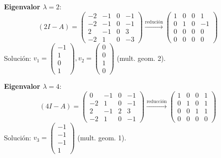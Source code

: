 \begin{prob}
\begin{enumerate}[$a)$]
\begin{myproof}
\textbf{Eigenvalor $\lambda=2$}:
\[
(2I - A) = \begin{pmatrix}
-2 & -1 & 0 & -1 \\
-2 & -1 & 0 & -1 \\
2 & -1 & 0 & 3 \\
-2 & 1 & 0 & -3
\end{pmatrix} \xrightarrow{\text{redución}} \begin{pmatrix}
1 & 0 & 0 & 1 \\
0 & 1 & 0 & -1 \\
0 & 0 & 0 & 0 \\
0 & 0 & 0 & 0
\end{pmatrix}
\]
Solución: $v_1 = \begin{pmatrix} -1 \\ 1 \\ 0 \\ 1 \end{pmatrix}, v_2 = \begin{pmatrix} 0 \\ 0 \\ 1 \\ 0 \end{pmatrix}$ (mult. geom. 2).

\textbf{Eigenvalor $\lambda=4$}:
\[
(4I - A) = \begin{pmatrix}
0 & -1 & 0 & -1 \\
-2 & 1 & 0 & -1 \\
2 & -1 & 2 & 3 \\
-2 & 1 & 0 & -1
\end{pmatrix} \xrightarrow{\text{reducción}} \begin{pmatrix}
1 & 0 & 0 & 1 \\
0 & 1 & 0 & 1 \\
0 & 0 & 1 & 1 \\
0 & 0 & 0 & 0
\end{pmatrix}
\]
Solución: $v_3 = \begin{pmatrix} -1 \\ -1 \\ -1 \\ 1 \end{pmatrix}$ (mult. geom. 1).


\end{myproof}
\end{enumerate}
\end{prob}
